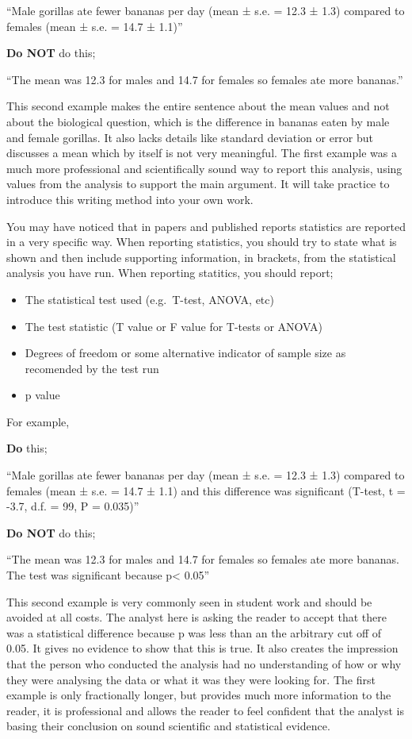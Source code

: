 \documentclass[
]{book}
\providecommand{\tightlist}{%
  \setlength{\itemsep}{0pt}\setlength{\parskip}{0pt}}
\begin{document}
``Male gorillas ate fewer bananas per day (mean ± s.e. = 12.3 ± 1.3) compared to females (mean ± s.e. = 14.7 ± 1.1)''

\textbf{Do NOT} do this;

``The mean was 12.3 for males and 14.7 for females so females ate more bananas.''

This second example makes the entire sentence about the mean values and not about the biological question, which is the difference in bananas eaten by male and female gorillas. It also lacks details like standard deviation or error but discusses a mean which by itself is not very meaningful. The first example was a much more professional and scientifically sound way to report this analysis, using values from the analysis to support the main argument. It will take practice to introduce this writing method into your own work.

You may have noticed that in papers and published reports statistics are reported in a very specific way. When reporting statistics, you should try to state what is shown and then include supporting information, in brackets, from the statistical analysis you have run. When reporting statitics, you should report;

\begin{itemize}
\tightlist
\item
  The statistical test used (e.g.~T-test, ANOVA, etc)
\item
  The test statistic (T value or F value for T-tests or ANOVA)
\item
  Degrees of freedom or some alternative indicator of sample size as recomended by the test run
\item
  p value
\end{itemize}

For example,

\textbf{Do} this;

``Male gorillas ate fewer bananas per day (mean ± s.e. = 12.3 ± 1.3) compared to females (mean ± s.e. = 14.7 ± 1.1) and this difference was significant (T-test, t = -3.7, d.f. = 99, P = 0.035)''

\textbf{Do NOT} do this;

``The mean was 12.3 for males and 14.7 for females so females ate more bananas. The test was significant because p\textless{} 0.05''

This second example is very commonly seen in student work and should be avoided at all costs. The analyst here is asking the reader to accept that there was a statistical difference because p was less than an the arbitrary cut off of 0.05. It gives no evidence to show that this is true. It also creates the impression that the person who conducted the analysis had no understanding of how or why they were analysing the data or what it was they were looking for. The first example is only fractionally longer, but provides much more information to the reader, it is professional and allows the reader to feel confident that the analyst is basing their conclusion on sound scientific and statistical evidence.
\end{document}
